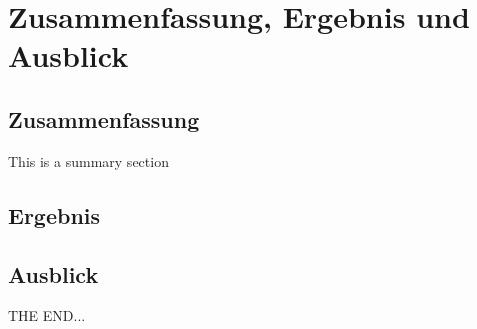 \chapter{Zusammenfassung, Ergebnis und Ausblick}
\label{conclusion:cha}


\section{Zusammenfassung}
This is a summary section

\section{Ergebnis}


\section{Ausblick}
THE END...
